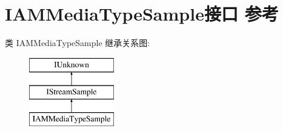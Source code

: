 \hypertarget{interface_i_a_m_media_type_sample}{}\section{I\+A\+M\+Media\+Type\+Sample接口 参考}
\label{interface_i_a_m_media_type_sample}
类 I\+A\+M\+Media\+Type\+Sample 继承关系图\+:\begin{figure}[H]
\begin{center}
\leavevmode
\includegraphics[height=3.000000cm]{interface_i_a_m_media_type_sample}
\end{center}
\end{figure}

